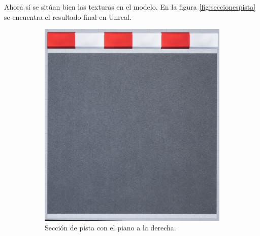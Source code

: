 Ahora sí se sitúan bien las texturas en el modelo. En la figura \ref{fig:seccionespista} se encuentra el resultado final en Unreal.

\begin{figure}[H]
    \centering
    \begin{subfigure}[t]{0.48\textwidth}
        \centering
        \includegraphics[width=\textwidth]{imagenes/converted/pista/track-final.jpg}
        \caption{Sección de pista con el piano a la derecha.}
        \label{fig:curvafinal2}
    \end{subfigure}
    \hfill
    \begin{subfigure}[t]{0.48\textwidth}
        \centering

\end{subfigure}
\end{figure}
